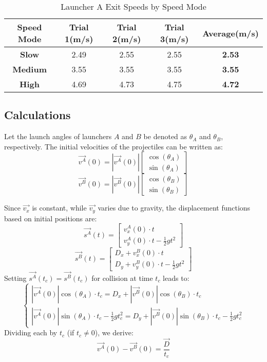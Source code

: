 \documentclass[12pt]{article}
\begin{document}
\begin{table}[H]
    \centering
    \begin{tabular}{|c|c|c|c|c|}
        \hline
        \textbf{Speed Mode} & \textbf{Trial 1}(m/s) & \textbf{Trial 2}(m/s) & \textbf{Trial 3}(m/s) & \textbf{Average}(m/s) \\ 
        \hline
        \textbf{Slow} & 2.49 & 2.55 & 2.55 & \textbf{2.53} \\ 
        \hline
        \textbf{Medium} & 3.55 & 3.55 & 3.55 & \textbf{3.55} \\ 
        \hline
        \textbf{High} & 4.69 & 4.73 & 4.75 & \textbf{4.72} \\ 
        \hline
    \end{tabular}
    \caption{Launcher A Exit Speeds by Speed Mode}
    \label{table:ISB}
\end{table}

\subsection{Calculations}
Let the launch angles of launchers \( A \) and \( B \) be denoted as \( \theta_A \) and \( \theta_B \), respectively. The initial velocities of the projectiles can be written as:
\[
\vec{v^A}(0) = |\vec{v^A}(0)|\begin{bmatrix} \cos(\theta_A) \\ \sin(\theta_A) \end{bmatrix}
\]
\[
\vec{v^B}(0) = |\vec{v^B}(0)|\begin{bmatrix} \cos(\theta_B) \\ \sin(\theta_B) \end{bmatrix}
\]

Since \(\vec{v_x}\) is constant, while \(\vec{v_y}\) varies due to gravity, the displacement functions based on initial positions are:
\[
\vec{s^A}(t) = \begin{bmatrix} v_x^A(0) \cdot t \\ v_y^A(0) \cdot t - \frac{1}{2} g t^2 \end{bmatrix}
\]
\[
\vec{s^B}(t) = \begin{bmatrix} D_x + v_x^B(0) \cdot t \\ D_y + v_y^B(0) \cdot t - \frac{1}{2} g t^2 \end{bmatrix}
\]
Setting \(\vec{s^A}(t_c) = \vec{s^B}(t_c)\) for collision at time \(t_c\) leads to:
\[
\begin{cases}
    |\vec{v^A}(0)| \cos(\theta_A) \cdot t_c = D_x + |\vec{v^B}(0)| \cos(\theta_B) \cdot t_c \\
    |\vec{v^A}(0)| \sin(\theta_A) \cdot t_c - \frac{1}{2} g t_c^2 = D_y + |\vec{v^B}(0)| \sin(\theta_B) \cdot t_c - \frac{1}{2} g t_c^2
\end{cases}
\]
Dividing each by \( t_c \) (if \( t_c \neq 0 \)), we derive:
\[
\vec{v^A}(0) - \vec{v^B}(0) = \frac{\vec{D}}{t_c}
\]
\end{document}
